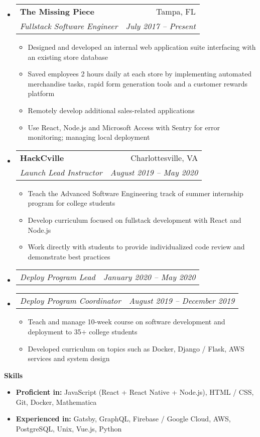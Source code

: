 \documentclass[letterpaper,12pt]{article}[leftmargin=*]
\makeatletter
\def \entryspacing {-0pt}
\renewcommand{\section}[2]{\vspace{5pt}
  \colorbox{secondary}{\color{white}\raggedbottom\normalsize\textbf{{#1}{\hspace{7pt}#2}}}
}
\newcommand{\resumeEntryStart}{\begin{itemize}[leftmargin=2.5mm]}
\newcommand{\resumeEntryEnd}{\end{itemize}\vspace{\entryspacing}}
\newcommand{\resumeItemListStart}{\begin{itemize}[leftmargin=4.5mm]}
\newcommand{\resumeItemListEnd}{\end{itemize}}
\newcommand{\resumeItem}[1]{
  \item\small{
    {#1 \vspace{-2pt}}
  }
}
\newcommand{\resumeEntryTSDL}[4]{
  \vspace{-1pt}\item[]
    \begin{tabular*}{0.97\textwidth}{l@{\extracolsep{\fill}}r}
      \textbf{\color{primary}#1} & {\firabook\color{accent}\small#2} \\
      \textit{\color{accent}\small#3} & \textit{\color{accent}\small#4} \\
    \end{tabular*}\vspace{-7pt}
}
\newcommand{\resumeEntrySD}[2]{
  \vspace{-1pt}\item[]
    \begin{tabular*}{0.97\textwidth}{l@{\extracolsep{\fill}}r}
      \textit{\color{accent}\small#1} & \textit{\color{accent}\small#2} \\
    \end{tabular*}\vspace{-6pt}
}
\newcommand{\resumeEntryS}[2]{
  \item[]\small{
    \textbf{\color{primary}#1} #2\vspace{-6pt}
  }
}
\makeatother
\begin{document}
  \resumeEntryStart
    \resumeEntryTSDL
      {The Missing Piece}{Tampa, FL}
      {Fullstack Software Engineer}{July 2017 -- Present}
    \resumeItemListStart
      \resumeItem {Designed and developed an internal web application suite interfacing with an existing store database}
      \resumeItem {Saved employees 2 hours daily at each store by implementing automated merchandise tasks, rapid form generation tools and a customer rewards platform}
      \resumeItem {Remotely develop additional sales-related applications}
      \resumeItem {Use React, Node.js and Microsoft Access with Sentry for error monitoring; managing local deployment}
    \resumeItemListEnd
  \resumeEntryEnd

  \resumeEntryStart
    \resumeEntryTSDL
      {HackCville}{Charlottesville, VA}
      {Launch Lead Instructor}{August 2019 -- May 2020}
    \resumeItemListStart
      \resumeItem {Teach the Advanced Software Engineering track of summer internship program for college students}
      \resumeItem{Develop curriculum focused on fullstack development with React and Node.js}
      \resumeItem {Work directly with students to provide individualized code review and demonstrate best practices}
    \resumeItemListEnd
    \resumeEntrySD
      {Deploy Program Lead}{January 2020 -- May 2020}
    \resumeEntrySD
      {Deploy Program Coordinator}{August 2019 -- December 2019}
    \resumeItemListStart
      \resumeItem {Teach and manage 10-week course on software development and deployment to 35+ college students}
      \resumeItem {Developed curriculum on topics such as Docker, Django / Flask, AWS services and system design}
    \resumeItemListEnd
  \resumeEntryEnd

\section{\faGears}{Skills}
 \resumeEntryStart
  \resumeEntryS{Proficient in:} {JavaScript (React + React Native + Node.js), HTML / CSS, Git, Docker, Mathematica}
  \resumeEntryS{Experienced in:} {Gatsby, GraphQL, Firebase / Google Cloud, AWS, PostgreSQL, Unix, Vue.js, Python}
 \resumeEntryEnd
\end{document}
